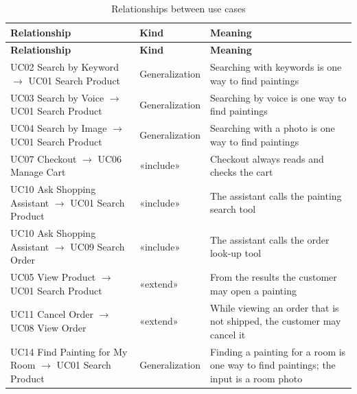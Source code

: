 \begin{longtable}{@{}P{5.4cm}P{2.6cm}P{7.0cm}@{}}
\caption{Relationships between use cases}\label{tab:uclinks}\\
\toprule
\small \textbf{Relationship} & \small \textbf{Kind} & \small \textbf{Meaning}\\
\midrule
\endfirsthead
\toprule
\small \textbf{Relationship} & \small \textbf{Kind} & \small \textbf{Meaning}\\
\midrule
\endhead
\bottomrule
\endlastfoot
\small UC02 Search by Keyword $\rightarrow$ UC01 Search Product & \small Generalization & \small Searching with keywords is one way to find paintings\\
\small UC03 Search by Voice $\rightarrow$ UC01 Search Product & \small Generalization & \small Searching by voice is one way to find paintings\\
\small UC04 Search by Image $\rightarrow$ UC01 Search Product & \small Generalization & \small Searching with a photo is one way to find paintings\\
\small UC07 Checkout $\rightarrow$ UC06 Manage Cart & \small «include» & \small Checkout always reads and checks the cart\\
\small UC10 Ask Shopping Assistant $\rightarrow$ UC01 Search Product & \small «include» & \small The assistant calls the painting search tool\\
\small UC10 Ask Shopping Assistant $\rightarrow$ UC09 Search Order & \small «include» & \small The assistant calls the order look-up tool\\
\small UC05 View Product $\rightarrow$ UC01 Search Product & \small «extend» & \small From the results the customer may open a painting\\
\small UC11 Cancel Order $\rightarrow$ UC08 View Order & \small «extend» & \small While viewing an order that is not shipped, the customer may cancel it\\
\small UC14 Find Painting for My Room $\rightarrow$ UC01 Search Product & \small Generalization & \small Finding a painting for a room is one way to find paintings; the input is a room photo\\
\end{longtable}
